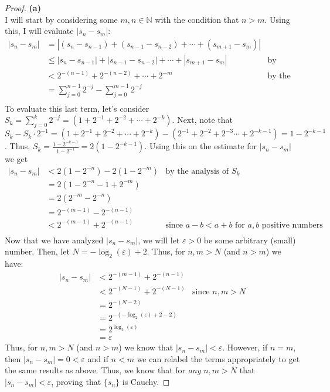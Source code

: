 \documentclass[10pt,a4paper]{article}
\theoremstyle{definition}
\begin{document}
\begin{proof}{\textbf{(a)}}
\\I will start by considering some $m,n \in \mathbb{N}$ with the condition that $n > m$. Using this, I will evaluate $|s_n - s_m|$:
\begin{align*}
|s_n - s_m| &= |(s_n - s_{n - 1}) + (s_{n-1} - s_{n-2}) + \cdots + (s_{m+1} - s_m)|\\
&\leq |s_n - s_{n-1}| + |s_{n-1} - s_{n-2}| + \cdots + |s_{m+1} - s_m| &\text{by Triangle Inequality}\\
&< 2^{-(n-1)} + 2^{-(n-2)} + \cdots + 2^{-m} &\text{by the definition of the sequence}\\
&= \sum_{j = 0}^{n - 1} 2^{-j} - \sum_{j = 0}^{m - 1} 2^{-j}\\
\end{align*}
To evaluate this last term, let's consider $\displaystyle S_k = \sum_{j = 0}^{k}2^{-j} = (1 + 2^{-1} + 2^{-2} + \cdots + 2^{-k})$. Next, note that $S_k - S_k \cdot 2^{-1} = (1 + 2^{-1} + 2^{-2} + \cdots + 2^{-k}) - (2^{-1} + 2^{-2} + 2^{-3} \cdots + 2^{-k - 1}) = 1 - 2^{-k-1}$. Thus, $\displaystyle S_k = \frac{1 - 2^{-k-1}}{1 - 2^{-1}} = 2(1 - 2^{-k-1})$. Using this on the estimate for $|s_n - s_m|$ we get
\begin{align*}
|s_n - s_m| &< 2(1 - 2^{-n}) - 2(1 - 2^{-m}) &\text{by the analysis of $S_k$}\\
&= 2(1 - 2^{-n} - 1 + 2^{-m})\\
&= 2(2^{-m} - 2^{-n})\\
&= 2^{-(m - 1)} - 2^{-(n-1)}\\
&< 2^{-(m-1)} + 2^{-(n-1)} &\text{since $a - b < a + b$ for $a,b$ positive numbers}\\
\end{align*}
Now that we have analyzed $|s_n - s_m|$, we will let $\varepsilon > 0$ be some arbitrary (small) number. Then, let $\displaystyle N = -\log_2(\varepsilon) + 2$. Thus, for $n,m > N$ (and $n > m$) we have:
\begin{align*}
|s_n - s_m| &< 2^{-(m-1)} + 2^{-(n-1)}\\
&< 2^{-(N-1)} + 2^{-(N-1)} &\text{since $n,m > N$}\\
&= 2^{-(N-2)}\\
&= 2^{-(-\log_2(\varepsilon) + 2 - 2)}\\
&= 2^{\log_2(\varepsilon)}\\
&= \varepsilon
\end{align*}
Thus, for $n,m >N$ (and $n > m$) we know that $|s_n - s_m| < \varepsilon$. However, if $n = m$, then $|s_n - s_m| = 0 < \varepsilon$ and if $n < m$ we can relabel the terms appropriately to get the same results as above. Thus, we know that for \textit{any} $n,m > N$ that $|s_n - s_m| < \varepsilon$, proving that $\{s_n\}$ is Cauchy.

\end{proof}
\end{document}
